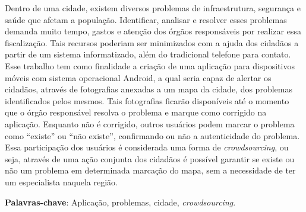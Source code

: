 \documentclass[
	12pt,				%
	openright,			%
	oneside,			%
	a4paper,			%
	english,			%
	french,				%
	spanish,			%
	brazil				%
	]{abntex2}
\begin{document}
\setlength{\absparsep}{18pt} %
\begin{resumo}
 Dentro de uma cidade, existem diversos problemas de infraestrutura, segurança e saúde que afetam a população. Identificar, analisar e resolver esses problemas demanda muito tempo, gastos e atenção dos órgãos responsáveis por realizar essa fiscalização. Tais recursos poderiam ser minimizados com a ajuda dos cidadãos a partir de um sistema informatizado, além do tradicional telefone para contato.
 \\Esse trabalho tem como finalidade a criação de uma aplicação para dispositivos móveis com sistema operacional Android, a qual seria capaz de alertar os cidadãos, através de fotografias anexadas a um mapa da cidade, dos problemas identificados pelos mesmos. Tais fotografias ficarão disponíveis até o momento que o órgão responsável resolva o problema e marque como corrigido na aplicação. Enquanto não é corrigido, outros usuários podem marcar o problema como “existe” ou “não existe”, confirmando ou não a autenticidade do problema.
 \\Essa participação dos usuários é considerada uma forma de \textit{crowdsourcing}, ou seja, através de uma ação conjunta dos cidadãos é possível garantir se existe ou não um problema em determinada marcação do mapa, sem a necessidade de ter um especialista naquela região. 
 
 
 \vspace{\onelineskip}
 
 \noindent
 \textbf{Palavras-chave}: Aplicação, problemas, cidade, \textit{crowdsourcing}.

\end{resumo}

%
% 
%
\end{document}
